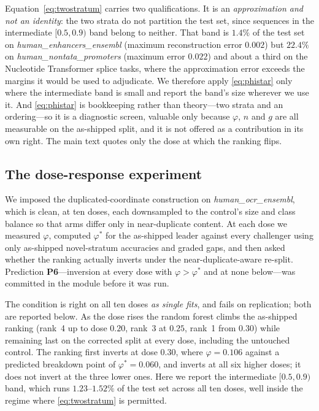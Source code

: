 \documentclass[11pt,a4paper]{article}
\begin{document}
Equation~\eqref{eq:twostratum} carries two qualifications. It is an \emph{approximation and not an
identity}: the two strata do not partition the test set, since sequences in the intermediate
$[0.5,0.9)$ band belong to neither. That band is $1.4\%$ of the test set on
\textit{human\_enhancers\_ensembl} (maximum reconstruction error $0.002$) but $22.4\%$ on
\textit{human\_nontata\_promoters} (maximum error $0.022$) and about a third on the Nucleotide
Transformer splice tasks, where the approximation error exceeds the margins it would be used to
adjudicate. We therefore apply \eqref{eq:phistar} only where the intermediate band is small and
report the band's size wherever we use it. And \eqref{eq:phistar} is bookkeeping rather than
theory---two strata and an ordering---so it is a diagnostic screen, valuable only because
$\varphi$, $n$ and $g$ are all measurable on the as-shipped split, and it is not offered as a
contribution in its own right. The main text quotes only the dose at which the ranking flips.

\subsection{The dose-response experiment}\label{sec:s-dose}
We imposed the duplicated-coordinate construction on \textit{human\_ocr\_ensembl}, which is clean,
at ten doses, each downsampled to the control's size and class balance so that arms differ only in
near-duplicate content. At each dose we measured $\varphi$, computed $\varphi^{*}$ for the
as-shipped leader against every challenger using only as-shipped novel-stratum accuracies and
graded gaps, and then asked whether the ranking actually inverts under the near-duplicate-aware
re-split. Prediction \textbf{P6}---inversion at every dose with $\varphi>\varphi^{*}$ and at none
below---was committed in the module before it was run.

The condition is right on all ten doses \emph{as single fits}, and fails on replication; both are reported below. As the dose rises the random forest climbs the as-shipped
ranking (rank~4 up to dose $0.20$, rank~3 at $0.25$, rank~1 from $0.30$) while remaining last on the
corrected split at every dose, including the untouched control. The ranking first inverts at dose
$0.30$, where $\varphi=0.106$ against a predicted breakdown point of $\varphi^{*}=0.060$, and
inverts at all six higher doses; it does not invert at the three lower ones. Here we report the
intermediate $[0.5,0.9)$ band, which runs $1.23$--$1.52\%$ of the test set across all ten doses,
well inside the regime where \eqref{eq:twostratum} is permitted.
\end{document}
